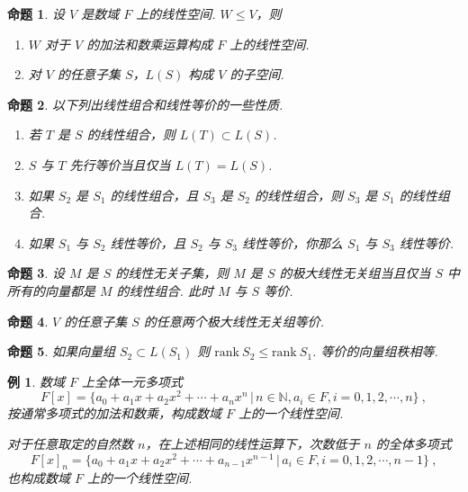 \documentclass[zihao=-4,UTF8,linespread=1.8,nothm]{aytony_base}
\newtheorem{proposition}{\indent 命题}[subsection]
\newtheorem{example}{\indent 例}[subsection]
\begin{document}
\begin{proposition}
    设 $V$ 是数域 $F$ 上的线性空间. $W \leqslant V$，则
    \begin{enumerate}[nosep]
        \item $W$ 对于 $V$ 的加法和数乘运算构成 $F$ 上的线性空间.
        \item 对 $V$ 的任意子集 $S$，$L(S)$ 构成 $V$ 的子空间.
    \end{enumerate}
\end{proposition}

\begin{proposition}
    以下列出线性组合和线性等价的一些性质.
    \begin{enumerate}[nosep]
        \item 若 $T$ 是 $S$ 的线性组合，则 $L(T) \subset L(S)$.
        \item $S$ 与 $T$ 先行等价当且仅当 $L(T) = L(S)$.
        \item 如果 $S_2$ 是 $S_1$ 的线性组合，且 $S_3$ 是 $S_2$ 的线性组合，则 $S_3$ 是 $S_1$ 的线性组合.
        \item 如果 $S_1$ 与 $S_2$ 线性等价，且 $S_2$ 与 $S_3$ 线性等价，你那么 $S_1$ 与 $S_3$ 线性等价.
    \end{enumerate}
\end{proposition}

\begin{proposition}
    设 $M$ 是 $S$ 的线性无关子集，则 $M$ 是 $S$ 的极大线性无关组当且仅当 $S$ 中所有的向量都是 $M$ 的线性组合. 此时 $M$ 与 $S$ 等价.
\end{proposition}

\begin{proposition}
    $V$ 的任意子集 $S$ 的任意两个极大线性无关组等价.
\end{proposition}

\begin{proposition}
    如果向量组 $S_2 \subset L(S_1)$ 则 $\mathrm{rank}\ S_2 \leqslant \mathrm{rank}\ S_1$. 等价的向量组秩相等.
\end{proposition}

\setcounter{example}{2}
\begin{example}
    数域 $F$ 上全体一元多项式 $$
        F[x] = \{a_0 + a_1x + a_2x^2 + \cdots + a_nx^n\,|\, n \in \mathbb{N}, a_i \in F, i = 0, 1, 2, \cdots, n\}\ ,
    $$ 按通常多项式的加法和数乘，构成数域 $F$ 上的一个线性空间.

    对于任意取定的自然数 $n$，在上述相同的线性运算下，次数低于 $n$ 的全体多项式 $$
        F[x]_n = \{a_0 + a_1x + a_2x^2 + \cdots + a_{n-1}x^{n-1}\,|\, a_i \in F, i = 0, 1, 2, \cdots, n-1\}\ ,
    $$ 也构成数域 $F$ 上的一个线性空间.
\end{example}
\end{document}
